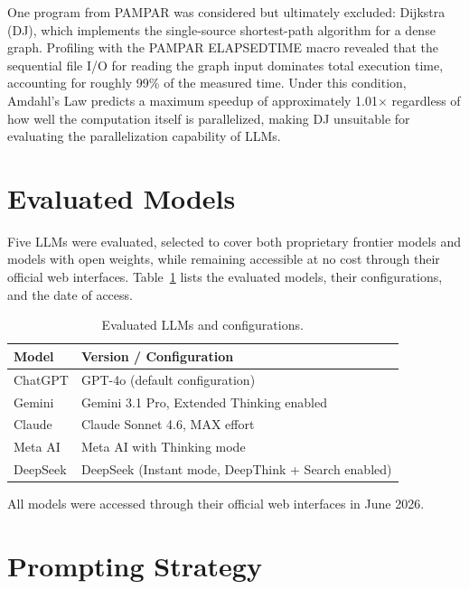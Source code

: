 One program from PAMPAR was considered but ultimately excluded: Dijkstra (DJ), which implements the single-source shortest-path algorithm for a dense graph. 
Profiling with the PAMPAR ELAPSEDTIME macro revealed that the sequential file I/O for reading the graph input dominates total execution time, accounting for roughly 99\% of the measured time. 
Under this condition, Amdahl's Law predicts a maximum speedup of approximately 1.01$\times$ regardless of how well the computation itself is parallelized, making DJ unsuitable for evaluating the parallelization capability of LLMs.

\section{Evaluated Models}
\label{sec:models}

Five LLMs were evaluated, selected to cover both proprietary frontier models and models with open weights, while remaining accessible at no cost through their official web interfaces.
Table~\ref{tab:models} lists the evaluated models, their configurations, and the date of access.

\begin{table}[ht]
\centering
\caption{Evaluated LLMs and configurations.}
\label{tab:models}
\begin{tabular}{ll}
\toprule
\textbf{Model} & \textbf{Version / Configuration} \\
\midrule
ChatGPT  & GPT-4o (default configuration)                     \\
Gemini   & Gemini 3.1 Pro, Extended Thinking enabled           \\
Claude   & Claude Sonnet 4.6, MAX effort                       \\
Meta AI  & Meta AI with Thinking mode                          \\
DeepSeek & DeepSeek (Instant mode, DeepThink + Search enabled) \\
\bottomrule
\end{tabular}
\end{table}

All models were accessed through their official web interfaces in June 2026.

\section{Prompting Strategy}
\label{sec:prompt}

